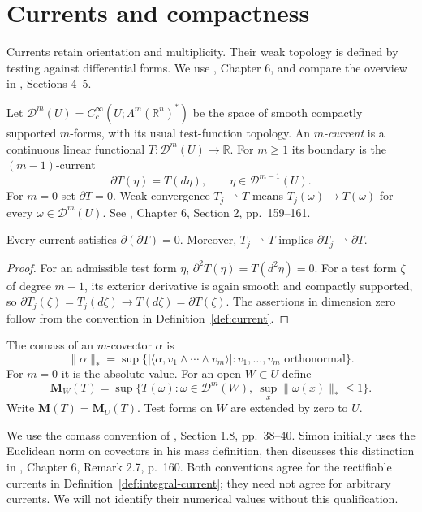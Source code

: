 \chapter{Currents and compactness}\label{sec:currents}
Currents retain orientation and multiplicity. Their weak topology is defined by testing against differential forms. We use \cite{Sim18}, Chapter 6, and compare the overview in \cite{Fle16}, Sections 4--5.

\begin{definition}\label{def:current}
Let $\mathcal{D}^m(U)=C_c^\infty(U;\Lambda^m(\mathbb{R}^n)^*)$ be the space of smooth compactly supported $m$-forms, with its usual test-function topology. An \emph{$m$-current} is a continuous linear functional $T:\mathcal{D}^m(U)\to\mathbb{R}$. For $m\geq1$ its boundary is the $(m-1)$-current
\[
 \partial T(\eta)=T(d\eta),\qquad\eta\in\mathcal{D}^{m-1}(U).
\]
For $m=0$ set $\partial T=0$. Weak convergence $T_j\rightharpoonup T$ means $T_j(\omega)\to T(\omega)$ for every $\omega\in\mathcal{D}^m(U)$. See \cite{Sim18}, Chapter 6, Section 2, pp.~159--161.
\end{definition}

\begin{proposition}\label{prop:boundary-current}
Every current satisfies $\partial(\partial T)=0$. Moreover, $T_j\rightharpoonup T$ implies $\partial T_j\rightharpoonup\partial T$.
\end{proposition}
\begin{proof}
For an admissible test form $\eta$, $\partial^2T(\eta)=T(d^2\eta)=0$. For a test form $\zeta$ of degree $m-1$, its exterior derivative is again smooth and compactly supported, so
$\partial T_j(\zeta)=T_j(d\zeta)\to T(d\zeta)=\partial T(\zeta)$.
The assertions in dimension zero follow from the convention in Definition~\ref{def:current}.
\end{proof}

\begin{definition}\label{def:mass-current}
The comass of an $m$-covector $\alpha$ is
\[
 \|\alpha\|_* =\sup\{|\langle\alpha,v_1\wedge\cdots\wedge v_m\rangle|:
             v_1,\ldots,v_m\text{ orthonormal}\}.
\]
For $m=0$ it is the absolute value. For an open $W\subset U$ define
\[
 \mathbf{M}_W(T)=\sup\{T(\omega):\omega\in\mathcal{D}^m(W),\
                 \sup_x\|\omega(x)\|_*\leq1\}.
\]
Write $\mathbf{M}(T)=\mathbf{M}_U(T)$. Test forms on $W$ are extended by zero to $U$.

We use the comass convention of \cite{Fed69}, Section 1.8, pp.~38--40. Simon initially uses the Euclidean norm on covectors in his mass definition, then discusses this distinction in \cite{Sim18}, Chapter 6, Remark 2.7, p.~160. Both conventions agree for the rectifiable currents in Definition~\ref{def:integral-current}; they need not agree for arbitrary currents. We will not identify their numerical values without this qualification.
\end{definition}


